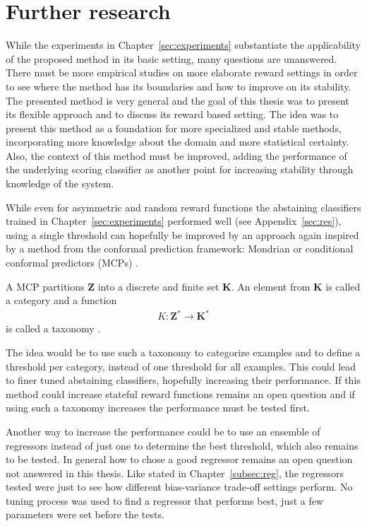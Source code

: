 \documentclass[twoside,11pt]{article}
\def\Z{\textbf{Z}}
\begin{document}

\section{Further research}
\label{sec:further_research}

While the experiments in Chapter~\ref{sec:experiments}
substantiate the applicability of the proposed method in
its basic setting, many questions are unanswered.
There must be more empirical studies on more elaborate
reward settings in order to see where the method has its
boundaries and how to improve on its stability.
The presented method is very general and the goal of this
thesis was to present its flexible approach and to discuss
its reward based setting.
The idea was to present this method as a foundation for
more specialized and stable methods, incorporating more
knowledge about the domain and more statistical certainty.
Also, the context of this method must be improved,
adding the performance of the underlying scoring classifier
as another point for increasing stability through knowledge
of the system.

While even for asymmetric and random reward functions the
abstaining classifiers trained in
Chapter~\ref{sec:experiments} performed well
(see Appendix~\ref{sec:res}), using a single threshold
can hopefully be improved by an approach again inspired by
a method from the conformal prediction framework:
Mondrian or conditional conformal predictors (MCPs)
\citep[see][]{alrw, cprml, fassbender_2019}.

\def\K{\textbf{K}}

A MCP partitions $\Z$ into a discrete and finite set
$\K$. An element from $\K$ is called a category and
a function
\begin{align*}
  K: \Z^* \rightarrow \K^*
\end{align*}
is called a taxonomy \citep[see][Chapter 2]{cprml}.

The idea would be to use such a taxonomy to categorize
examples and to define a threshold per category, instead of
one threshold for all examples.
This could lead to finer tuned abstaining classifiers,
hopefully increasing their performance.
If this method could increase stateful reward functions
remains an open question and if using such a taxonomy
increases the performance must be tested first.

Another way to increase the performance could be to use
an ensemble of regressors instead of just one to determine
the best threshold, which also remains to be tested.
In general how to chose a good regressor remains an open
question not answered in this thesis.
Like stated in Chapter~\ref{subsec:reg}, the regressors
tested were just to see how different bias-variance
trade-off settings perform.
No tuning process was used to find a regressor that
performs best, just a few parameters were set before the
tests.
\end{document}
